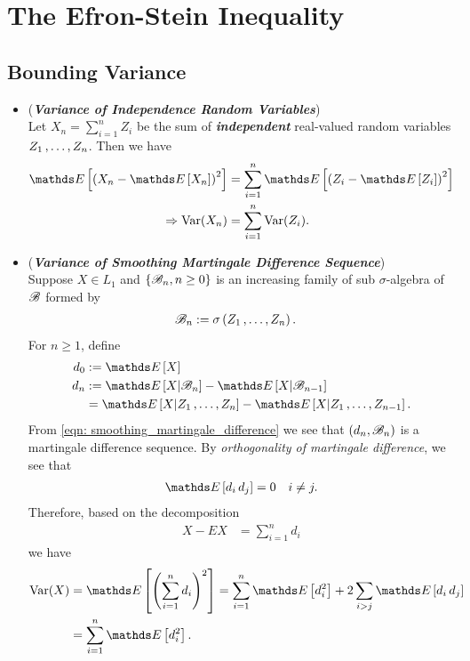 \documentclass[11pt]{article}
\begin{document}
\section{The Efron-Stein Inequality}
\subsection{Bounding Variance}
\begin{itemize}
\item \begin{remark} (\textbf{\emph{Variance of Independence Random Variables}})\\
Let $X_n =  \sum_{i=1}^{n}Z_i$ be the sum of \emph{\textbf{independent}} real-valued random variables $Z_1 \,{,}\ldots{,}\, Z_n$. Then we have 
\begin{align*}
\E{}{\paren{X_n - \E{}{X_n}}^2} &= \sum_{i=1}^{n}\E{}{\paren{Z_i - \E{}{Z_i}}^2}\\
\Rightarrow \text{Var}(X_n) &= \sum_{i=1}^{n}\text{Var}(Z_i).
\end{align*}
\end{remark}

\item \begin{remark} (\textbf{\emph{Variance of Smoothing Martingale Difference Sequence}})\\
Suppose $X \in L_1$ and $\left\{{\mathscr B}_n, n \ge 0\right\}$ is an increasing family of sub $\sigma$-algebra of ${\mathscr B}$ formed by 
\begin{align*}
{\mathscr B}_n &:= \sigma\left(Z_1 \,{,}\ldots{,}\, Z_n\right).
\end{align*} For $n \ge 1$, define 
\begin{align*}
d_0 &:= \E{}{X} \\ 
d_n &:= \E{}{X | \srB_n} - \E{}{X | \srB_{n-1}} \\
&= \E{}{X | Z_1 \xdotx{,} Z_n} -  \E{}{X | Z_1 \xdotx{,} Z_{n-1}}.
\end{align*} From \eqref{eqn: smoothing_martingale_difference} we see that $(d_n, {\mathscr B}_n)$ is a martingale difference sequence. By \emph{orthogonality of martingale difference}, we see that 
\begin{align*}
\E{}{d_i\, d_j} =0 \quad i\neq j.
\end{align*} Therefore, based on the decomposition
\begin{align*}
X - E{}{X} &= \sum_{i=1}^{n}d_i
\end{align*}
we have 
\begin{align}
\text{Var}(X) &= \E{}{\paren{\sum_{i=1}^{n}d_i}^2} = \sum_{i=1}^{n}\E{}{d_i^2} + 2 \sum_{i > j}\E{}{d_i\,d_j}\nonumber\\
&=  \sum_{i=1}^{n}\E{}{d_i^2}. \label{eqn: martingale_smoothing}
\end{align}
\end{remark}


\end{itemize}
\end{document}
